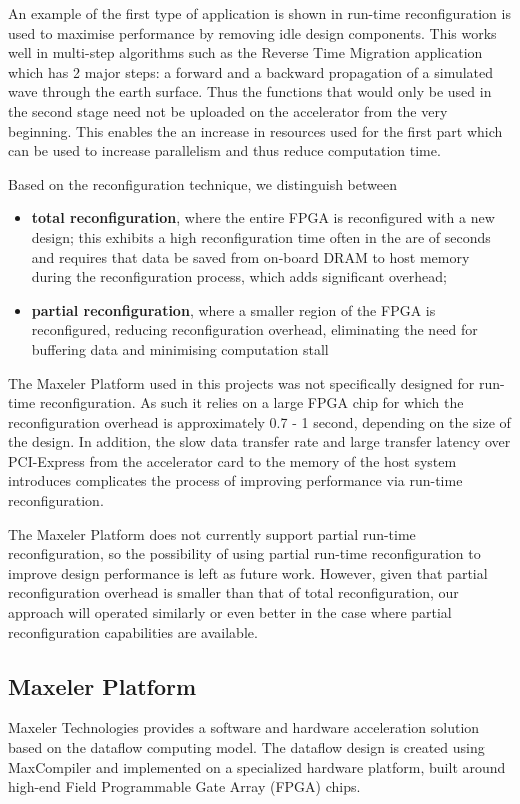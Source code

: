 An example of the first type of application is shown in
\cite{Xinyu:Qiwei:Luk:Qiang:Pell:2012} run-time reconfiguration is
used to maximise performance by removing idle design components. This
works well in multi-step algorithms such as the Reverse Time Migration
application which has 2 major steps: a forward and a backward
propagation of a simulated wave through the earth surface. Thus the
functions that would only be used in the second stage need not be
uploaded on the accelerator from the very beginning. This enables the
an increase in resources used for the first part which can be used to
increase parallelism and thus reduce computation time.

Based on the reconfiguration technique, we distinguish between
\begin{itemize}
\item \textbf{total reconfiguration}, where the entire FPGA is
  reconfigured with a new design; this exhibits a high reconfiguration
  time often in the are of seconds and requires that data be saved
  from on-board DRAM to host memory during the reconfiguration
  process, which adds significant overhead;
\item \textbf{partial reconfiguration}, where a smaller region of the
  FPGA is reconfigured, reducing reconfiguration overhead, eliminating
  the need for buffering data and minimising computation stall
\end{itemize}

The Maxeler Platform used in this projects was not specifically
designed for run-time reconfiguration. As such it relies on a large
FPGA chip for which the reconfiguration overhead is approximately 0.7
- 1 second, depending on the size of the design. In addition, the slow
data transfer rate and large transfer latency over PCI-Express from
the accelerator card to the memory of the host system introduces
complicates the process of improving performance via run-time
reconfiguration.

The Maxeler Platform does not currently support partial run-time
reconfiguration, so the possibility of using partial run-time
reconfiguration to improve design performance is left as future
work. However, given that partial reconfiguration overhead is smaller
than that of total reconfiguration, our approach will operated
similarly or even better in the case where partial reconfiguration
capabilities are available.

\subsection{Maxeler Platform}
\label{sec:maxeler-platform}
Maxeler Technologies provides a software and hardware acceleration
solution based on the dataflow computing model. The dataflow design is
created using MaxCompiler \cite{Maxeler} and implemented on a specialized
hardware platform, built around high-end Field Programmable Gate Array
(FPGA) chips.


